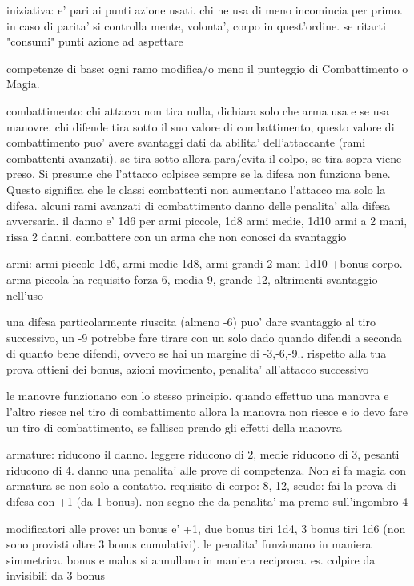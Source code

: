 \documentclass[12pt,a4paper,twoside,openany]{book}
\begin{document}
iniziativa: e' pari ai punti azione usati. chi ne usa di meno incomincia per primo. in caso di parita' si controlla mente, volonta', corpo in quest'ordine. se ritarti "consumi" punti azione ad aspettare

competenze di base: ogni ramo modifica/o meno il punteggio di Combattimento o Magia.

combattimento: chi attacca non tira nulla, dichiara solo che arma usa e se usa manovre. chi difende tira sotto il suo valore di combattimento, questo valore di combattimento puo' avere svantaggi dati da abilita' dell'attaccante (rami combattenti avanzati). se tira sotto allora para/evita il colpo, se tira sopra viene preso.
Si presume che l'attacco colpisce sempre se la difesa non funziona bene. Questo significa che le classi combattenti non aumentano l'attacco ma solo la difesa. alcuni rami avanzati di combattimento danno delle penalita' alla difesa avversaria.
il danno e' 1d6 per armi piccole, 1d8 armi medie, 1d10 armi a 2 mani, rissa 2 danni.
combattere con un arma che non conosci da svantaggio


armi: armi piccole 1d6, armi medie 1d8, armi grandi 2 mani 1d10 +bonus corpo. arma piccola ha requisito forza 6, media 9, grande 12, altrimenti svantaggio nell'uso

una difesa particolarmente riuscita (almeno -6) puo' dare svantaggio al tiro successivo, un -9 potrebbe fare tirare con un solo dado
quando difendi  a seconda di quanto bene difendi, ovvero se hai un margine di -3,-6,-9.. rispetto alla tua prova ottieni dei bonus, azioni movimento, penalita' all'attacco successivo

le manovre funzionano con lo stesso principio. quando effettuo una manovra e l'altro riesce nel tiro di combattimento allora la manovra non riesce e io devo fare un tiro di combattimento, se fallisco prendo gli effetti della manovra

armature: riducono il danno. leggere riducono di 2, medie riducono di 3, pesanti riducono di 4. danno una penalita' alle prove di competenza. Non si fa magia con armatura se non solo a contatto. requisito di corpo: 8, 12, 
scudo: fai la prova di difesa con +1 (da 1 bonus). non segno che da penalita' ma premo sull'ingombro 4

modificatori alle prove: un bonus e' +1, due bonus tiri 1d4, 3 bonus tiri 1d6 (non sono provisti oltre 3 bonus cumulativi). le penalita' funzionano in maniera simmetrica. bonus e malus si annullano in maniera reciproca. es. colpire da invisibili da 3 bonus
\end{document}
